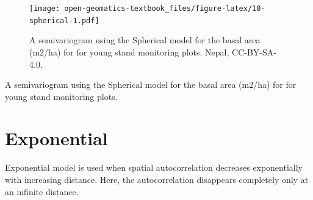 \documentclass[
]{book}
\begin{document}
\begin{figure}
\centering
\texttt{[image: open-geomatics-textbook\_files/figure-latex/10-spherical-1.pdf]}
\caption{\label{fig:10-spherical}A semivariogram using the Spherical model for the basal area (m2/ha) for for young stand monitoring plots. Nepal, CC-BY-SA-4.0.}
\end{figure}

A semivariogram using the Spherical model for the basal area (m2/ha) for for young stand monitoring plots.

\hypertarget{exponential}{%
\section{Exponential}\label{exponential}}

Exponential model is used when spatial autocorrelation decreases exponentially with increasing distance. Here, the autocorrelation disappears completely only at an infinite distance.
\end{document}
